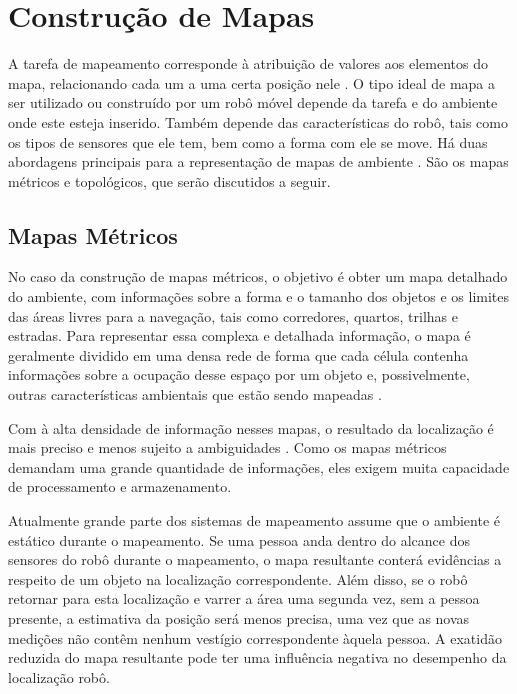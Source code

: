 \section{Construção de Mapas}
A tarefa de mapeamento corresponde à atribuição de valores aos elementos do mapa, relacionando cada um a uma certa 
posição nele \cite{construcaoMapas2}. O tipo ideal de mapa
a ser utilizado ou construído por um robô móvel depende da tarefa e do ambiente onde
este esteja inserido. Também depende das características do robô, tais como os tipos
de sensores que ele tem, bem como a forma com ele se move\cite{construcaoMapas2}.  Há duas abordagens principais para a 
representação de mapas de ambiente \cite{construcaoMapas}.
São os mapas métricos e topológicos, que serão discutidos a seguir. 

\subsection{Mapas Métricos}
No caso da construção de mapas métricos, o objetivo é obter um mapa detalhado do ambiente, 
com informações sobre a forma e o tamanho dos objetos e os limites das
áreas livres para a navegação, tais como corredores, quartos, trilhas e estradas. Para
representar essa complexa e detalhada informação, o mapa é geralmente dividido em
uma densa rede de forma que cada célula contenha informações sobre a ocupação
desse espaço por um objeto e, possivelmente, outras características ambientais que
estão sendo mapeadas \cite{construcaoMapas2}. 

Com à alta densidade de informação nesses mapas, o resultado da localização é mais preciso e
menos sujeito a ambiguidades \cite{construcaoMapas2}. Como os mapas métricos 
demandam uma grande quantidade de informações, eles exigem muita capacidade de processamento e 
armazenamento.

Atualmente grande parte dos sistemas de mapeamento assume que o ambiente é estático
durante o mapeamento. Se uma pessoa anda dentro do alcance dos sensores do robô durante o
mapeamento, o mapa resultante conterá evidências a respeito de um objeto na localização
correspondente. Além disso, se o robô retornar para esta localização e varrer a área uma
segunda vez, sem a pessoa presente, a estimativa da posição será menos precisa, uma vez que as novas medições não
contêm nenhum vestígio correspondente àquela pessoa. A exatidão reduzida do mapa
resultante pode ter uma influência negativa no desempenho da localização robô.

